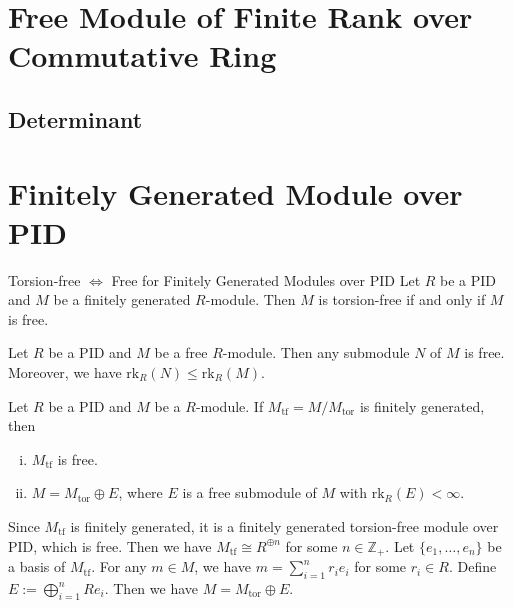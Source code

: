 \section{Free Module of Finite Rank over Commutative Ring}
\subsection{Determinant}


\section{Finitely Generated Module over PID}

\begin{proposition}{Torsion-free $\iff$ Free for Finitely Generated Modules over PID}{}
    Let $R$ be a PID and $M$ be a finitely generated $R$-module. Then $M$ is torsion-free if and only if $M$ is free.
\end{proposition}

\begin{proposition}{}{}
    Let $R$ be a PID and $M$ be a free $R$-module. Then any submodule $N$ of $M$ is free. Moreover, we have $\mathrm{rk}_R(N)\le \mathrm{rk}_R(M)$.
\end{proposition}

\begin{proposition}{}{}
    Let $R$ be a PID and $M$ be a $R$-module. If $M_{\mathrm{tf}}=M/M_{\mathrm{tor}}$ is finitely generated, then 
    \begin{enumerate}[(i)]
        \item $M_{\mathrm{tf}}$ is free.
        \item $M=M_{\mathrm{tor}}\oplus E$, where $E$ is a free submodule of $M$ with $\mathrm{rk}_R(E)<\infty$.
    \end{enumerate}
\end{proposition}
\begin{prf}
    Since $M_{\mathrm{tf}}$ is finitely generated, it is a finitely generated torsion-free module over PID, which is free. Then we have $M_{\mathrm{tf}}\cong R^{\oplus n}$ for some $n\in \mathbb{Z}_+$. Let $\{e_1, \ldots, e_n\}$ be a basis of $M_{\mathrm{tf}}$. For any $m\in M$, we have $m=\sum_{i=1}^n r_i e_i$ for some $r_i\in R$. Define $E:=\bigoplus_{i=1}^n Re_i$. Then we have $M=M_{\mathrm{tor}}\oplus E$.
\end{prf}








